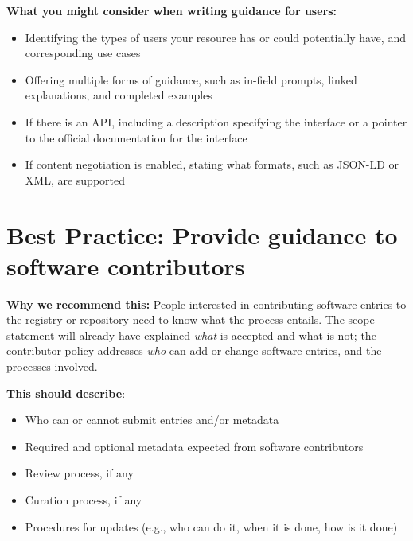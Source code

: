 \documentclass[11pt]{article}
\begin{document}
\textbf{What you might consider when writing guidance for users:}

\begin{itemize}
\item Identifying the types of users your resource has or could potentially have, and corresponding use cases

\item Offering multiple forms of guidance, such as in-field prompts, linked explanations, and completed examples

\item If there is an API, including a description specifying the interface or a pointer to the official documentation for the interface

\item If content negotiation is enabled, stating what formats, such as JSON-LD or XML, are supported

\end{itemize}


\section{Best Practice: Provide guidance to software contributors}
\label{best-practice-provide-guidance-to-software-contributors}

\textbf{Why we recommend this:} People interested in contributing software entries to the registry or repository need to know what the process entails. The scope statement will already have explained \emph{what} is accepted and what is not; the contributor policy addresses \emph{who} can add or change software entries, and the processes involved.

\textbf{This should describe}:

\begin{itemize}
\item Who can or cannot submit entries and/or metadata

\item Required and optional metadata expected from software contributors

\item Review process, if any

\item Curation process, if any

\item Procedures for updates (e.g., who can do it, when it is done, how is it done)

\end{itemize}
\end{document}

